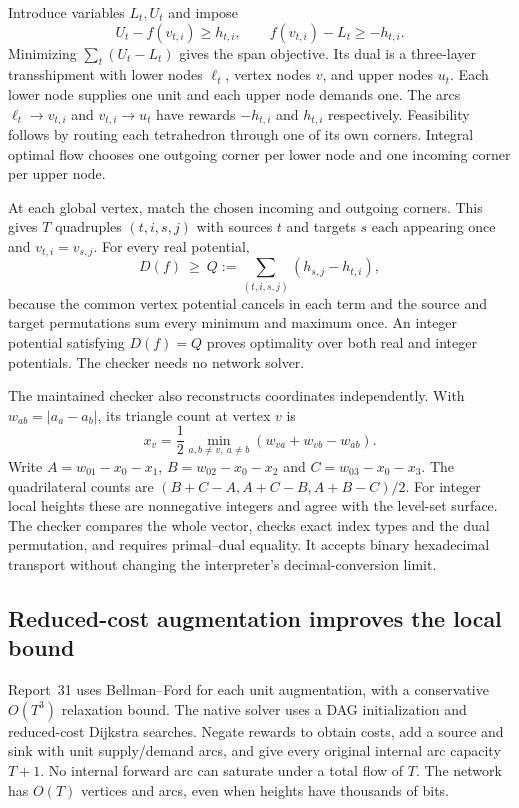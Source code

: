Introduce variables $L_t,U_t$ and impose
\[
 U_t-f(v_{t,i})\ge h_{t,i},\qquad
 f(v_{t,i})-L_t\ge-h_{t,i}.
\]
Minimizing $\sum_t(U_t-L_t)$ gives the span objective. Its dual is a
three-layer transshipment with lower nodes $\ell_t$, vertex nodes $v$, and
upper nodes $u_t$. Each lower node supplies one unit and each upper node
demands one. The arcs $\ell_t\to v_{t,i}$ and $v_{t,i}\to u_t$ have
rewards $-h_{t,i}$ and $h_{t,i}$ respectively. Feasibility follows by routing
each tetrahedron through one of its own corners. Integral optimal flow
chooses one outgoing corner per lower node and one incoming corner per
upper node.

At each global vertex, match the chosen incoming and outgoing corners.
This gives $T$ quadruples $(t,i,s,j)$ with sources $t$ and targets $s$ each
appearing once and $v_{t,i}=v_{s,j}$. For every real potential,
\[
 D(f)\ \ge\ Q:=\sum_{(t,i,s,j)}(h_{s,j}-h_{t,i}),
\]
because the common vertex potential cancels in each term and the source
and target permutations sum every minimum and maximum once. An integer
potential satisfying $D(f)=Q$ proves optimality over both real and integer
potentials. The checker needs no network solver.

The maintained checker also reconstructs coordinates independently. With
$w_{ab}=|a_a-a_b|$, its triangle count at vertex $v$ is
\[
 x_v=\frac12\min_{a,b\ne v,\ a\ne b}(w_{va}+w_{vb}-w_{ab}).
\]
Write $A=w_{01}-x_0-x_1$, $B=w_{02}-x_0-x_2$ and
$C=w_{03}-x_0-x_3$. The quadrilateral counts are
$(B+C-A,A+C-B,A+B-C)/2$. For integer local heights these are nonnegative
integers and agree with the level-set surface. The checker compares the
whole vector, checks exact index types and the dual permutation, and
requires primal--dual equality. It accepts binary hexadecimal transport
without changing the interpreter's decimal-conversion limit.

\subsection{Reduced-cost augmentation improves the local bound}

Report~31 uses Bellman--Ford for each unit augmentation, with a conservative
$O(T^3)$ relaxation bound. The native solver uses a DAG initialization and
reduced-cost Dijkstra searches. Negate rewards to obtain costs, add a source
and sink with unit supply/demand arcs, and give every original internal arc
capacity $T+1$. No internal forward arc can saturate under a total flow of
$T$. The network has $O(T)$ vertices and arcs, even when heights have
thousands of bits.

